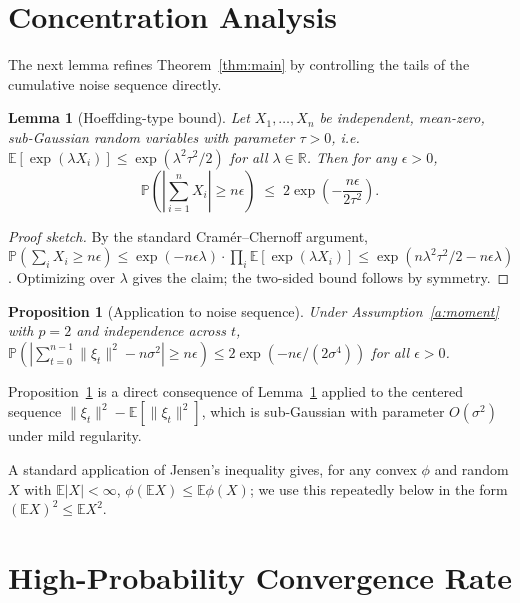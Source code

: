 \documentclass[11pt]{article}
\newtheorem{lemma}{Lemma}
\newtheorem{proposition}{Proposition}
\theoremstyle{definition}
\newcommand{\E}{\mathbb{E}}
\newcommand{\RR}{\mathbb{R}}
\renewcommand{\Pr}{\mathbb{P}}
\begin{document}
\newpage
\section{Concentration Analysis}

The next lemma refines Theorem~\ref{thm:main} by controlling the tails of the cumulative noise sequence directly.

\begin{lemma}[Hoeffding-type bound]\label{lem:hoeff}
Let $X_1, \ldots, X_n$ be independent, mean-zero, sub-Gaussian random variables with parameter $\tau > 0$, i.e.\ $\E[\exp(\lambda X_i)] \le \exp(\lambda^2 \tau^2 / 2)$ for all $\lambda \in \RR$. Then for any $\epsilon > 0$,
\begin{equation}\label{eq:hoeff}
\Pr\!\left( \left| \sum_{i=1}^{n} X_i \right| \ge n\epsilon \right)
\;\le\; 2\exp\!\left( -\frac{n\epsilon}{2\tau^2} \right).
\end{equation}
\end{lemma}

\begin{proof}[Proof sketch]
By the standard Cram\'er--Chernoff argument, $\Pr(\sum_i X_i \ge n\epsilon) \le \exp(-n\epsilon \lambda) \cdot \prod_i \E[\exp(\lambda X_i)] \le \exp(n\lambda^2 \tau^2 / 2 - n\epsilon \lambda)$. Optimizing over $\lambda$ gives the claim; the two-sided bound follows by symmetry.
\end{proof}

\begin{proposition}[Application to noise sequence]\label{prop:noise}
Under Assumption~\ref{a:moment} with $p = 2$ and independence across $t$,
$\Pr\!\left( \left| \sum_{t=0}^{n-1} \|\xi_t\|^2 - n \sigma^2 \right| \ge n\epsilon \right) \le 2\exp(-n\epsilon/(2\sigma^4))$
for all $\epsilon > 0$.
\end{proposition}

Proposition~\ref{prop:noise} is a direct consequence of Lemma~\ref{lem:hoeff} applied to the centered sequence $\|\xi_t\|^2 - \E[\|\xi_t\|^2]$, which is sub-Gaussian with parameter $O(\sigma^2)$ under mild regularity.

A standard application of Jensen's inequality gives, for any convex $\phi$ and random $X$ with $\E|X| < \infty$, $\phi(\E X) \le \E \phi(X)$; we use this repeatedly below in the form $(\E X)^2 \le \E X^2$.

\section{High-Probability Convergence Rate}
\end{document}
